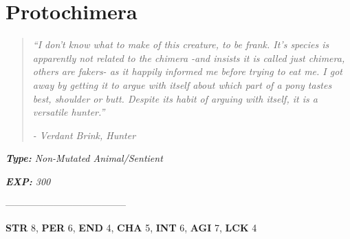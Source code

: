 \documentclass[11pt,a4paper,twocolumn]{book}
\begin{document}
	\section*{Protochimera}
	\begin{quote}
		\emph{``I don't know what to make of this creature, to be frank. It's species is apparently not related to the chimera -and insists it is called just chimera, others are fakers- as it happily informed me before trying to eat me. I got away by getting it to argue with itself about which part of a pony tastes best, shoulder or butt. Despite its habit of arguing with itself, it is a versatile hunter.''}
		
		\emph{-	Verdant Brink, Hunter}
	\end{quote}
	
	\noindent
	\emph{\textbf{Type:} Non-Mutated Animal/Sentient}
	
	\noindent
	\emph{\textbf{EXP:} 300}
	
%		
%	
%		
%	

--------------------------------------

\noindent
\textbf{STR} 8, \textbf{PER} 6, \textbf{END} 4, \textbf{CHA} 5, \textbf{INT} 6, \textbf{AGI} 7, \textbf{LCK} 4
\end{document}
